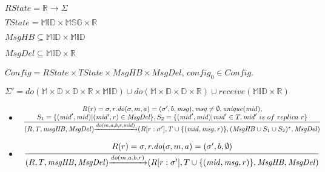 \begin{figure}[ht]
$\mathit{RState} = \mathbb{R} \rightarrow \Sigma$

$\mathit{TState} = \mathbb{MID} \times \mathbb{MSG} \times \mathbb{R}$

$\mathit{MsgHB} \subseteq \mathbb{MID} \times \mathbb{MID}$

$\mathit{MsgDel} \subseteq \mathbb{MID} \times \mathbb{R}$

$\mathit{Config} = \mathit{RState} \times \mathit{TState} \times \mathit{MsgHB} \times \mathit{MsgDel}$, $\mathit{config}_0 \in \mathit{Config}$.

$\Sigma' = \mathit{do}(\mathbb{M} \times \mathbb{D} \times \mathbb{D} \times \mathbb{R} \times \mathbb{MID}) \cup \mathit{do}(\mathbb{M} \times \mathbb{D} \times \mathbb{D} \times \mathbb{R}) \cup \mathit{receive}(\mathbb{MID} \times \mathbb{R})$

\begin{itemize}
\setlength{\itemsep}{0.5pt}
\item[] $\begin{array}{l c}
   \bigfrac{
   \begin{array}{c}
     R(r) = \sigma, r.\mathit{do}(\sigma,m,a) = (\sigma',b,\mathit{msg}), \mathit{msg} \neq \emptyset, \mathit{unique}(\mathit{mid}), \\
     S_1 = \{ (\mathit{mid}',\mathit{mid}) \vert (\mathit{mid'},r) \in \mathit{MsgDel} \}, S_2 = \{ (\mathit{mid}',\mathit{mid}) \vert \mathit{mid}' \in T, \mathit{mid}' \ is \ of \ replica \ r \}
   \end{array}}
     {(R,T,\mathit{msgHB},\mathit{MsgDel}) {\xrightarrow{\mathit{do}(m,a,b,r,\mathit{mid})}} (R[r:\sigma'], T \cup \{ (\mathit{mid},\mathit{msg},r) \}, (\mathit{MsgHB} \cup S_1 \cup S_2)^*,\mathit{MsgDel})}
\end{array}$

\item[] $\begin{array}{l c}
   \bigfrac{
   \begin{array}{c}
     R(r) = \sigma, r.\mathit{do}(\sigma,m,a) = (\sigma',b,\emptyset)
   \end{array}}
     {(R,T,\mathit{msgHB},\mathit{MsgDel}) {\xrightarrow{\mathit{do}(m,a,b,r)}} (R[r:\sigma'], T \cup \{ (\mathit{mid},\mathit{msg},r) \}, \mathit{MsgHB},\mathit{MsgDel})}
\end{array}$


\end{itemize}
\end{figure}
